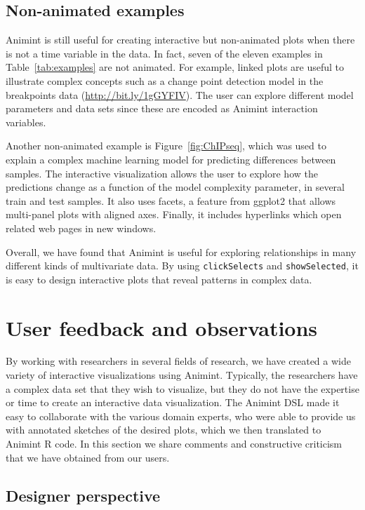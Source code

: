 \documentclass[10pt,journal,compsoc]{IEEEtran}\usepackage[]{graphicx}\usepackage[]{color}
\begin{document}
\subsection{Non-animated examples}

Animint is still useful for creating interactive but
non-animated plots when there is not a time variable in the data. 
In fact, seven of the eleven examples in
Table~\ref{tab:examples} are not animated. For example, linked plots
are useful to illustrate complex concepts such as a change point
detection model in the breakpoints data
(\url{http://bit.ly/1gGYFIV}). The user can explore different model
parameters and data sets since these are encoded as Animint
interaction variables.

Another non-animated example is Figure~\ref{fig:ChIPseq}, which was
used to explain a complex machine learning model for predicting
differences between samples. The interactive visualization allows the
user to explore how the predictions change as a function of the model
complexity parameter, in several train and test samples. It also uses
facets, a feature from ggplot2 that allows multi-panel plots with
aligned axes. Finally, it includes hyperlinks which open related web
pages in new windows.

Overall, we have found that Animint is useful for exploring
relationships in many different kinds of multivariate data. By using
\texttt{clickSelects} and \texttt{showSelected}, it is easy to design
interactive plots that reveal patterns in complex data.

\section{User feedback and observations}

By working with researchers in several fields of research,
we have created a wide variety of
interactive visualizations using Animint.
Typically, the researchers have a complex data set that
they wish to visualize,
but they do not have the expertise or time to create
an interactive data visualization.
The Animint DSL made it easy to collaborate with the various domain experts,
who were able to provide us with annotated sketches of the desired plots,
which we then translated to Animint R code.
In this section we share comments and
constructive criticism that we have obtained from our users.

\subsection{Designer perspective}
\end{document}
